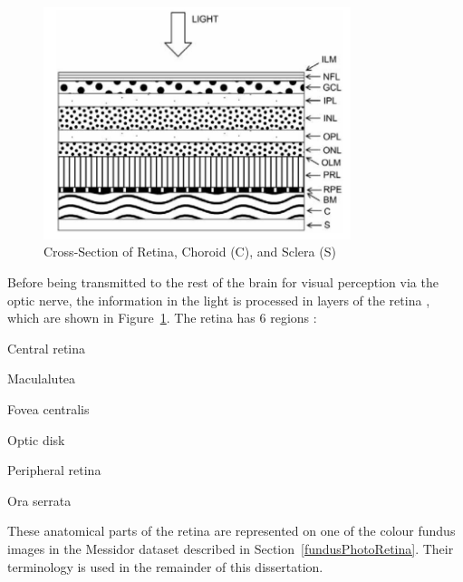 \begin{figure}[t]
\centering
\includegraphics[width=0.8\textwidth]{Figures/layers_of_retina}
\caption{Cross-Section of Retina, Choroid (C), and Sclera (S) \citep[from][]{falt2012modern}}
\label{layersOfRetina}
\end{figure}


Before being transmitted to the rest of the brain for visual perception via the optic nerve, the information in the light is processed in layers of the retina \citep{kauppi2010eye}, which are shown in Figure~\ref{layersOfRetina}. The retina has 6 regions \citep{forrester2015eye}:
\begin{compactenum}
    \item Central retina
    \item Maculalutea
    \item Fovea centralis
    \item Optic disk
    \item Peripheral retina
    \item Ora serrata
\end{compactenum}
These anatomical parts of the retina are represented on one of the colour fundus images in the Messidor dataset \citep{mookiah2015application} described in Section~\ref{fundusPhotoRetina}. Their terminology is used in the remainder of this dissertation.

